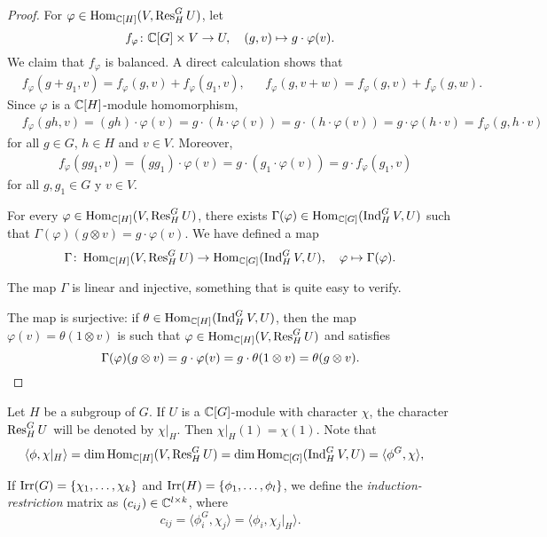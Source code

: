 \begin{proof}
For $\varphi\in\operatorname{Hom}_{\mathbb{C}[H]}(V,\operatorname{Res}_H^GU)$, let 
\[
f_{\varphi}\colon \mathbb{C}[G]\times V\to U,
\quad
(g,v)\mapsto g\cdot\varphi(v).
\]
We claim that $f_{\varphi}$ is balanced. A direct calculation shows that 
\begin{align*}
    &f_{\varphi}(g+g_1,v)=f_{\varphi}(g,v)+f_{\varphi}(g_1,v),&&
    f_{\varphi}(g,v+w)=f_{\varphi}(g,v)+f_{\varphi}(g,w).
\end{align*}
Since $\varphi$ is a $\mathbb{C}[H]$-module homomorphism,
\begin{align*}
    &f_{\varphi}(gh,v)=(gh)\cdot\varphi(v)
    =g\cdot (h\cdot \varphi(v))
    =g\cdot (h\cdot\varphi(v))
    =g\cdot \varphi(h\cdot v)=f_{\varphi}(g,h\cdot v)
\end{align*}
for all $g\in G$, $h\in H$ and $v\in V$. Moreover, 
\begin{align*}
    &f_{\varphi}(gg_1,v)=(gg_1)\cdot\varphi(v)=g\cdot(g_1\cdot\varphi(v))=g\cdot f_{\varphi}(g_1,v)
\end{align*}
for all $g,g_1\in G$ y $v\in V$. 

For every $\varphi\in\operatorname{Hom}_{\mathbb{C}[H]}(V,\operatorname{Res}_H^GU)$, there exists 
$\Gamma(\varphi)\in\operatorname{Hom}_{\mathbb{C}[G]}(\operatorname{Ind}_H^GV,U)$ such that 
$\Gamma(\varphi)(g\otimes v)=g\cdot\varphi(v)$. 
We have defined a map  
\[
\Gamma\colon \operatorname{Hom}_{\mathbb{C}[H]}(V,\operatorname{Res}_H^GU)\to\operatorname{Hom}_{\mathbb{C}[G]}(\operatorname{Ind}_H^GV,U),
\quad
\varphi\mapsto\Gamma(\varphi).
\]

The map $\Gamma$ is linear and injective, something that is quite easy to verify. 

The map is surjective: if $\theta\in\operatorname{Hom}_{\mathbb{C}[H]}(\operatorname{Ind}_H^GV,U)$, then
the map $\varphi(v)=\theta(1\otimes v)$ is such that $\varphi\in\operatorname{Hom}_{\mathbb{C}[H]}(V,\operatorname{Res}_H^GU)$ and satisfies 
\[
\Gamma(\varphi)(g\otimes v)=g\cdot\varphi(v)=g\cdot\theta(1\otimes v)=\theta(g\otimes v).\qedhere
\]
\end{proof}


Let $H$ be a subgroup of $G$. If $U$ is a $\mathbb{C}[G]$-module with character $\chi$, the character $\operatorname{Res}_H^GU$ will be denoted by $\chi|_H$. Then $\chi|_H(1)=\chi(1)$. Note that 
\begin{align*}
\langle \phi,\chi|_H\rangle
&=\dim\operatorname{Hom}_{\mathbb{C}[H]}(V,\operatorname{Res}_H^GU)
=\dim\operatorname{Hom}_{\mathbb{C}[G]}(\operatorname{Ind}_H^GV,U)
=\langle\phi^G,\chi\rangle,
\end{align*}


\begin{definition}
If $\operatorname{Irr}(G)=\{\chi_1,\dots,\chi_k\}$ and $\operatorname{Irr}(H)=\{\phi_1,\dots,\phi_l\}$, we define the \emph{induction-restriction} matrix as $(c_{ij})\in\mathbb{C}^{l\times k}$, where 
\[
c_{ij}=\langle \phi_i^G,\chi_j\rangle=\langle\phi_i,\chi_j|_H\rangle.
\]
\end{definition}

